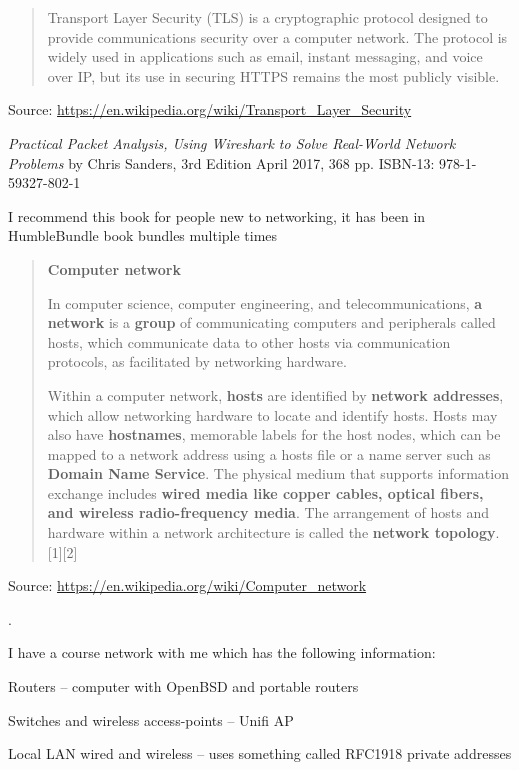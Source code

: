 \documentclass[Screen16to9,17pt]{foils}
\begin{document}
\begin{quote}\small
Transport Layer Security (TLS) is a cryptographic protocol designed to provide communications security over a computer network. The protocol is widely used in applications such as email, instant messaging, and voice over IP, but its use in securing HTTPS remains the most publicly visible.
\end{quote}
Source: \url{https://en.wikipedia.org/wiki/Transport_Layer_Security}




\emph{Practical Packet Analysis,
Using Wireshark to Solve Real-World Network Problems}
by Chris Sanders, 3rd Edition
April 2017, 368 pp.
ISBN-13:
978-1-59327-802-1

I recommend this book for people new to networking, it has been in HumbleBundle book bundles multiple times






\begin{quote}
\textbf{\large Computer network}

In computer science, computer engineering, and telecommunications, \textbf{a network} is a \textbf{group} of communicating computers and peripherals called hosts, which communicate data to other hosts via communication protocols, as facilitated by networking hardware.

Within a computer network, \textbf{hosts} are identified by \textbf{network addresses}, which allow networking hardware to locate and identify hosts. Hosts may also have \textbf{hostnames}, memorable labels for the host nodes, which can be mapped to a network address using a hosts file or a name server such as \textbf{Domain Name Service}. The physical medium that supports information exchange includes \textbf{wired media like copper cables, optical fibers, and wireless radio-frequency media}. The arrangement of hosts and hardware within a network architecture is called the \textbf{network topology}.[1][2]


\end{quote}
Source: \url{https://en.wikipedia.org/wiki/Computer_network}


.

I have a course network with me which has the following information:
\begin{list2}
\item Routers -- computer with OpenBSD and portable routers
\item Switches and wireless access-points -- Unifi AP
\item Local LAN wired and wireless -- uses something called RFC1918 private addresses
\end{list2}
\end{document}
